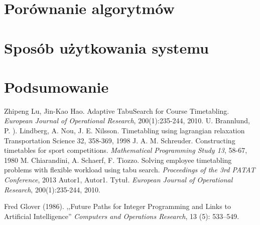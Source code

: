 \documentclass[11pt]{report}
\begin{document}
\chapter{Porównanie algorytmów}
\chapter{Sposób użytkowania systemu}
\chapter{Podsumowanie}

\begin{thebibliography}{2}
 Zhipeng Lu, Jin-Kao Hao. Adaptive TabuSearch for Course Timetabling.  \emph{European Journal of Operational Research}, 200(1):235-244, 2010.
 U. Brannlund, P. ). Lindberg, A. Nou, J. E. Nilsson. Timetabling using lagrangian relaxation Transportation Science 32, 358-369, 1998
 J. A. M. Schreuder. Constructing timetables for sport competitions. \emph{Mathematical Programming Study 13}, 58-67, 1980
 M. Chiarandini, A. Schaerf, F. Tiozzo. Solving employee timetabling problems with flexible workload using tabu search. \emph{Proceedings of the 3rd PATAT Conference}, 2013
 Autor1, Autor1. Tytuł.  \emph{European Journal of Operational Research}, 200(1):235-244, 2010.

 Fred Glover (1986). ,,Future Paths for Integer Programming and Links to Artificial Intelligence'' \emph{Computers and Operations Research}, 13 (5): 533–549.

\end{thebibliography}
\end{document}

